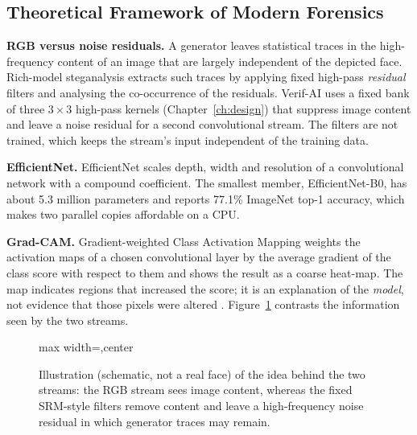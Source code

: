 \subsection{Theoretical Framework of Modern Forensics}
\textbf{RGB versus noise residuals.} A generator leaves statistical traces in the high-frequency content of an image that are largely
independent of the depicted face. Rich-model steganalysis \citep{fridrich2012srm} extracts such traces by applying fixed high-pass
\emph{residual} filters and analysing the co-occurrence of the residuals. Verif-AI uses a fixed bank of three $3\times3$ high-pass
kernels (Chapter~\ref{ch:design}) that suppress image content and leave a noise residual for a second convolutional stream. The filters
are not trained, which keeps the stream's input independent of the training data.

\textbf{EfficientNet.} EfficientNet \citep{tan2019efficientnet} scales depth, width and resolution of a convolutional network with a
compound coefficient. The smallest member, EfficientNet-B0, has about 5.3 million parameters and reports 77.1\% ImageNet top-1
accuracy, which makes two parallel copies affordable on a CPU.

\textbf{Grad-CAM.} Gradient-weighted Class Activation Mapping \citep{selvaraju2017gradcam} weights the activation maps of a chosen
convolutional layer by the average gradient of the class score with respect to them and shows the result as a coarse heat-map. The map
indicates regions that increased the score; it is an explanation of the \emph{model}, not evidence that those pixels were altered
\citep{selvaraju2017gradcam}. Figure~\ref{fig:srm-concept} contrasts the information seen by the two streams.

\begin{figure}[ht]
\centering
\begin{adjustbox}{max width=\linewidth,center}
\end{adjustbox}
\caption[Illustration (schematic, not a real face) of the idea behind the two streams: the RGB stream]{Illustration (schematic, not a real face) of the idea behind the two streams: the RGB stream sees image content, whereas the fixed
SRM-style filters remove content and leave a high-frequency noise residual in which generator traces may remain.}
\label{fig:srm-concept}
\end{figure}

